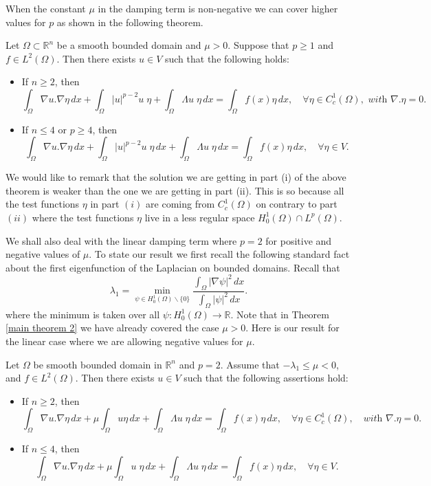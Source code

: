 \documentclass[reqno]{amsart}
\begin{document}
When the constant $\mu$ in the damping term  is non-negative  we can cover
higher values for $p$  as shown in the following theorem.

\begin{theorem} \label{main theorem 2}
Let \(\Omega \subset \mathbb{R}^n\) be  a smooth bounded domain and \(\mu>0\).
Suppose that \( p\geq1\)  and \(f\in L^2(\Omega)\). Then there exists \(u \in V\) such
that the following holds:
 \begin{itemize}
\item[(i)] If \(n\geq 2\), then
 \[ \int_\Omega\nabla u.\nabla\eta\,dx
 + \int_\Omega |{u}|^{p-2}u\; \eta  + \int_\Omega \Lambda u\;\eta\,dx
 =\int_\Omega f(x)\eta\,dx,\quad \forall\eta\in  C_c^1(\Omega),  \textit{ with }
  \nabla. \eta=0.
 \]

\item[(ii)] If \(n\leq 4 \) or \(p\geq 4\), then
\[
\int_\Omega\nabla u.\nabla\eta\,dx
+ \int_\Omega |{u}|^{p-2}u\; \eta \,dx+ \int_\Omega \Lambda u\;\eta\,dx
=\int_\Omega f(x)\eta\,dx,\quad \forall\eta \in V.
\]
\end{itemize}
\end{theorem}

We would like to remark that the solution we are getting in part (i) of the above
theorem is weaker than the one we are getting in part (ii).
This is so because all the test functions  $\eta$ in  part $(i)$ are coming from
$C_c^1(\Omega)$ on contrary to part $(ii)$  where the test functions  $\eta$
live in a less regular space $ H_0^1(\Omega)\cap L^p(\Omega)$.

We shall also deal with the linear damping term where $p=2$ for positive and negative
values of $\mu$.
To state our result we first recall the following standard fact about the first
eigenfunction  of the Laplacian on bounded domains. Recall that
\[
 \lambda_1 = \min_{\psi\in H_0^1(\Omega)\backslash \{0\}}
 \frac{\int_{\Omega} |\nabla \psi|^2\,dx}{\int_\Omega  |\psi|^{2}\,dx}.
\]
where the minimum is taken over all $\psi: H_0^1(\Omega)\to\mathbb{R} $.
Note that in Theorem \ref{main theorem 2} we have already covered the case $\mu>0$.
Here is our result for the linear case where we are allowing negative values for $\mu$.

\begin{theorem}\label{main theorem 3}
Let \(\Omega\) be  smooth bounded domain in \(\mathbb{R} ^n\)  and  \(p=2\).
Assume that \(-\lambda_1\leq\mu<0\),  and \(f\in L^2(\Omega) \).
Then there exists \(u \in V\) such that the following  assertions hold:
\begin{itemize}
\item[(i)] If \(n\geq 2\), then  \[\int_\Omega\nabla u.\nabla\eta\,dx
+\mu \int_\Omega u\eta\,dx  + \int_\Omega \Lambda u\;\eta\,dx
=\int_\Omega f(x)\eta\,dx,\quad \forall\eta\in  C_c^1(\Omega),\quad
 \textit{with } \nabla . \eta=0.
 \]

\item[(ii)] If \(n\leq 4 \), then \[\int_\Omega\nabla u.\nabla\eta\,dx
+ \mu\int_\Omega u\; \eta\,dx + \int_\Omega \Lambda u\;\eta\,dx
 =\int_\Omega f(x)\eta\,dx,\quad \forall\eta \in V.
\]
\end{itemize}
\end{theorem}
\end{document}
